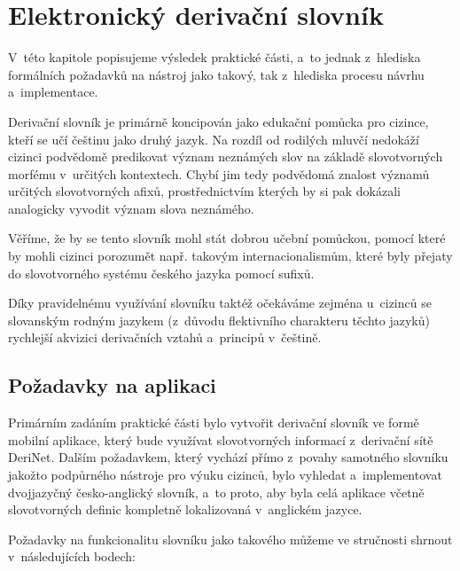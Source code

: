 \hypertarget{elektronickuxfd-derivaux10dnuxed-slovnuxedk}{%
\chapter{Elektronický derivační
slovník}\label{elektronickuxfd-derivaux10dnuxed-slovnuxedk}}

V~této kapitole popisujeme výsledek praktické části, a~to jednak
z~hlediska formálních požadavků na nástroj jako takový, tak z~hlediska
procesu návrhu a~implementace.

Derivační slovník je primárně koncipován jako edukační pomůcka pro
cizince, kteří se učí češtinu jako druhý jazyk. Na rozdíl od rodilých
mluvčí nedokáží cizinci podvědomě predikovat význam neznámých slov na
základě slovotvorných morfému v~určitých kontextech. Chybí jim tedy
podvědomá znalost významů určitých slovotvorných afixů, prostřednictvím
kterých by si pak dokázali analogicky vyvodit význam slova neznámého.

Věříme, že by se tento slovník mohl stát dobrou učební pomůckou, pomocí
které by mohli cizinci porozumět např. takovým internacionalismům, které
byly přejaty do slovotvorného systému českého jazyka pomocí sufixů.

Díky pravidelnému využívání slovníku taktéž očekáváme zejména u~cizinců
se slovanským rodným jazykem (z~důvodu flektivního charakteru těchto
jazyků) rychlejší akvizici derivačních vztahů a~principů v~češtině.

\hypertarget{poux17eadavky-na-aplikaci}{%
\section{Požadavky na aplikaci}\label{poux17eadavky-na-aplikaci}}

Primárním zadáním praktické části bylo vytvořit derivační slovník ve
formě mobilní aplikace, který bude využívat slovotvorných informací
z~derivační sítě DeriNet. Dalším požadavkem, který vychází přímo z~povahy
samotného slovníku jakožto podpůrného nástroje pro výuku cizinců, bylo
vyhledat a~implementovat dvojjazyčný česko-anglický slovník, a~to proto,
aby byla celá aplikace včetně slovotvorných definic kompletně
lokalizovaná v~anglickém jazyce.

Požadavky na funkcionalitu slovníku jako takového můžeme ve stručnosti
shrnout v~následujících bodech:

